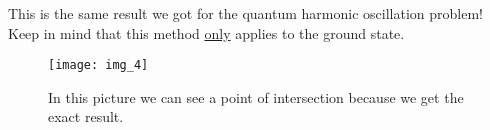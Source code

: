 		This is the same result we got for the quantum harmonic oscillation problem! Keep in mind that this method \underline{only} applies to the ground state.

		\begin{figure}[h!]
			\centering
			\texttt{[image: img\_4]}
			\caption{In this picture we can see a point of intersection because we get the exact result.}
			\label{fig:intersect}
		\end{figure}
